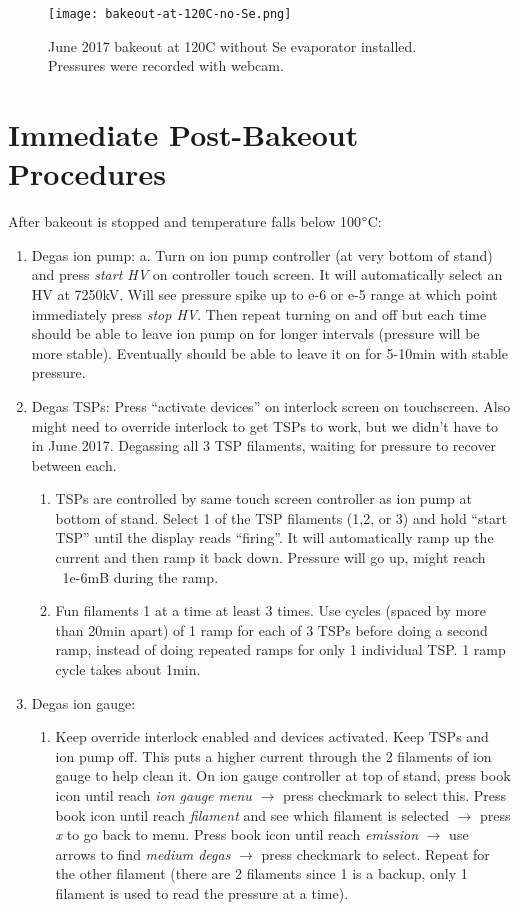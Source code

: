 \begin{figure}[H]
	\centering
	\texttt{[image: bakeout-at-120C-no-Se.png]} 
	\caption{June 2017 bakeout at 120C without Se evaporator installed. Pressures were recorded with webcam.}
	\label{fig:June-bakeout}
\end{figure}



\section{Immediate Post-Bakeout Procedures}
After bakeout is stopped and temperature falls below 100$\degree$C:
\begin{enumerate}
\item	Degas ion pump:
a.	Turn on ion pump controller (at very bottom of stand) and press \emph{start HV} on controller touch screen. It will automatically select an HV at 7250kV. Will see pressure spike up to e-6 or e-5 range at which point immediately press \emph{stop HV}.  Then repeat turning on and off but each time should be able to leave ion pump on for longer intervals (pressure will be more stable). Eventually should be able to leave it on for 5-10min with stable pressure.
\item	Degas TSPs: 
Press “activate devices” on interlock screen on touchscreen. Also might need to override interlock to get TSPs to work, but we didn't have to in June 2017. Degassing all 3 TSP filaments, waiting for pressure to recover between each.
\begin{enumerate}
\item	TSPs are controlled by same touch screen controller as ion pump at bottom of stand. Select 1 of the TSP filaments (1,2, or 3) and hold “start TSP” until the display reads “firing”. It will automatically ramp up the current and then ramp it back down. Pressure will go up, might reach ~1e-6mB during the ramp. 
\item	Fun filaments 1 at a time at least 3 times. Use cycles (spaced by more than 20min apart) of 1 ramp for each of 3 TSPs before doing a second ramp, instead of doing repeated ramps for only 1 individual TSP. 1 ramp cycle takes about 1min. 
\end{enumerate}
\item	Degas ion gauge: 
\begin{enumerate}
\item	Keep override interlock enabled and devices activated. Keep TSPs and ion pump off. This puts a higher current through the 2 filaments of ion gauge to help clean it. On ion gauge controller at top of stand, press book icon until reach \emph{ion gauge menu} $\rightarrow$ press checkmark to select this. Press book icon until reach \emph{filament} and see which filament is selected $\rightarrow$ press \emph{x} to go back to menu. Press book icon until reach \emph{emission} $\rightarrow$ use arrows to find \emph{medium degas} $\rightarrow$ press checkmark to select. Repeat for the other filament (there are 2 filaments since 1 is a backup, only 1 filament is used to read the pressure at a time).

\end{enumerate}
\end{enumerate}
